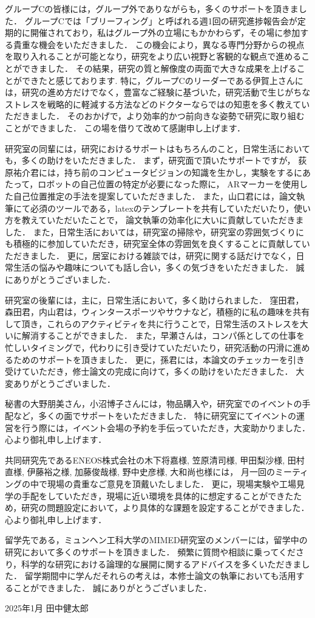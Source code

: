 \documentclass[../main]{subfiles}
\begin{document}
グループCの皆様には，グループ外でありながらも，多くのサポートを頂きました．
グループCでは「ブリーフィング」と呼ばれる週1回の研究進捗報告会が定期的に開催されており，私はグループ外の立場にもかかわらず，その場に参加する貴重な機会をいただきました．
この機会により，異なる専門分野からの視点を取り入れることが可能となり，研究をより広い視野と客観的な観点で進めることができました．
その結果，研究の質と解像度の両面で大きな成果を上げることができたと感じております.
特に，グループCのリーダーである伊賀上さんには，研究の進め方だけでなく，豊富なご経験に基づいた，研究活動で生じがちなストレスを戦略的に軽減する方法などのドクターならではの知恵を多く教えていただきました．
そのおかげで，より効率的かつ前向きな姿勢で研究に取り組むことができました．
この場を借りて改めて感謝申し上げます．

研究室の同輩には，研究におけるサポートはもちろんのこと，日常生活においても，多くの助けをいただきました．
まず，研究面で頂いたサポートですが，
荻原祐介君には，持ち前のコンピュータビジョンの知識を生かし，実験をするにあたって，ロボットの自己位置の特定が必要になった際に，
ARマーカーを使用した自己位置推定の手法を提案していただきました．
また，山口君には，論文執筆にて必須のツールである，latexのテンプレートを共有していただいたり，使い方を教えていただいたことで，
論文執筆の効率化に大いに貢献していただきました．
また，日常生活においては，研究室の掃除や，研究室の雰囲気づくりにも積極的に参加していただき，研究室全体の雰囲気を良くすることに貢献していただきました．
更に，居室における雑談では，研究に関する話だけでなく，日常生活の悩みや趣味についても話し合い，多くの気づきをいただきました．
誠にありがとうございました．

研究室の後輩には，主に，日常生活において，多く助けられました．
窪田君，森田君，内山君は，ウィンタースポーツやサウナなど，積極的に私の趣味を共有して頂き，これらのアクティビティを共に行うことで，日常生活のストレスを大いに解消することができました．
また，早瀬さんは，コンパ係としての仕事を忙しいタイミングで，代わりに引き受けていただいたり，研究活動の円滑に進めるためのサポートを頂きました．
更に，孫君には，本論文のチェッカーを引き受けていただき，修士論文の完成に向けて，多くの助けをいただきました．
大変ありがとうございました．


秘書の大野朋美さん，小沼博子さんには，物品購入や，研究室でのイベントの手配など，多くの面でサポートをいただきました．
特に研究室にてイベントの運営を行う際には，イベント会場の予約を手伝っていただき，大変助かりました．
心より御礼申し上げます．

共同研究先であるENEOS株式会社の木下将嘉様, 笠原清司様, 甲田梨沙様, 田村直様, 伊藤裕之様, 加藤俊哉様, 野中史彦様, 大和尚也様には，
月一回のミーティングの中で現場の貴重なご意見を頂戴いたしました．
更に，現場実験や工場見学の手配をしていただき，現場に近い環境を具体的に想定することができたため，研究の問題設定において，より具体的な課題を設定することができました．
心より御礼申し上げます．

留学先である，ミュンヘン工科大学のMIMED研究室のメンバーには，留学中の研究において多くのサポートを頂きました．
頻繁に質問や相談に乗ってくださり，科学的な研究における論理的な展開に関するアドバイスを多くいただきました．
留学期間中に学んだそれらの考えは，本修士論文の執筆においても活用することができました．
誠にありがとうございました．

\begin{flushright}
  2025年1月 田中健太郎
\end{flushright}
\end{document}
